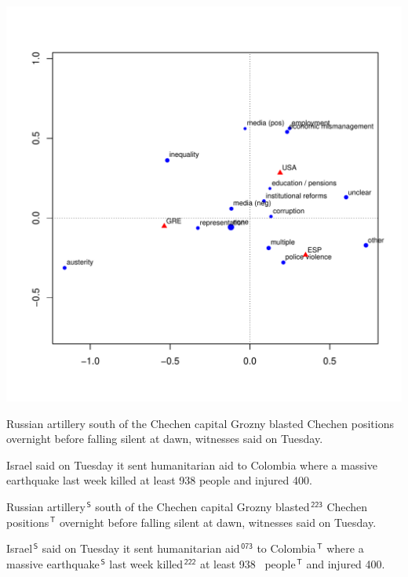 \documentclass{mediumfoils}
\newcommand{\mkred}[1]{{\color{bloodred}#1}}
\newcommand{\mkblue}[1]{{\color{darkblue}#1}}
\newcommand{\mkgreen}[1]{{\color{darkgreen}#1}}
\begin{document}
\centerline{\includegraphics[scale=1]{issues-by-country-ca}}

\slide{}


                                                      
Russian artillery south of the Chechen
capital Grozny blasted Chechen
positions overnight before falling silent
at dawn, witnesses said on Tuesday.

\noindent                                                                       
Israel said on Tuesday it sent
  humanitarian aid to
Colombia where a massive
  earthquake last week
killed at least 938 people and injured 400.


                                                                                                                               
\mkred{Russian artillery}$^{\,\mathsf{S}}$ south of the Chechen
capital
Grozny \mkgreen{blasted}$^{\,\mathsf{223}}$ \mkblue{Chechen
positions}$^{\,\mathsf{T}}$ overnight before falling silent
at dawn, witnesses said on Tuesday.

\noindent                                                          
\mkred{Israel}$^{\,\mathsf{S}}$ said on Tuesday it \mkgreen{sent
  humanitarian aid}$^{\,\mathsf{073}}$ to
\mkblue{Colombia}$^{\,\mathsf{T}}$ where a \mkred{massive
  earthquake}$^{\,\mathsf{S}}$ last week
\mkgreen{killed}$^{\,\mathsf{222}}$ at least \mkblue{938~
people}$^{\,\mathsf{T}}$ and injured 400.
~\\
\end{document}
